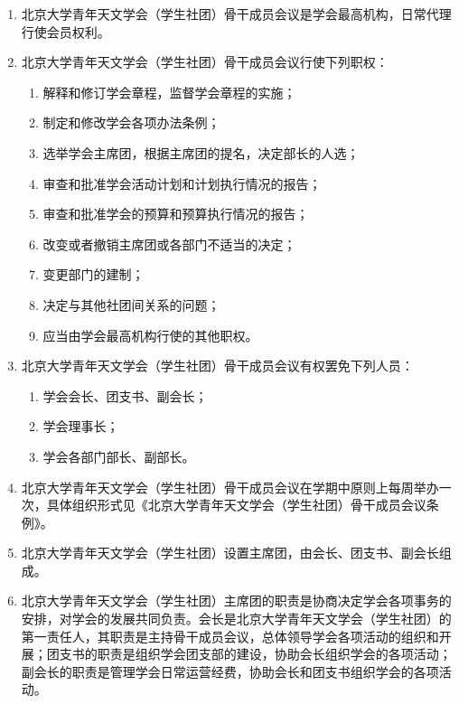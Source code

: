 \begin{enumerate}[resume]
    \item 北京大学青年天文学会（学生社团）骨干成员会议是学会最高机构，日常代理行使会员权利。
    
    \item 北京大学青年天文学会（学生社团）骨干成员会议行使下列职权：
    
    \begin{enumerate}
        \item 解释和修订学会章程，监督学会章程的实施；
        \item 制定和修改学会各项办法条例；
        \item 选举学会主席团，根据主席团的提名，决定部长的人选；
        \item 审查和批准学会活动计划和计划执行情况的报告；
        \item 审查和批准学会的预算和预算执行情况的报告；
        \item 改变或者撤销主席团或各部门不适当的决定；
        \item 变更部门的建制；
        \item 决定与其他社团间关系的问题；
        \item 应当由学会最高机构行使的其他职权。
    \end{enumerate}
    
    \item 北京大学青年天文学会（学生社团）骨干成员会议有权罢免下列人员：
    
    \begin{enumerate}
        \item 学会会长、团支书、副会长；
        \item 学会理事长；
        \item 学会各部门部长、副部长。
    \end{enumerate}
    
    \item 北京大学青年天文学会（学生社团）骨干成员会议在学期中原则上每周举办一次，具体组织形式见《北京大学青年天文学会（学生社团）骨干成员会议条例》。
    
    \item 北京大学青年天文学会（学生社团）设置主席团，由会长、团支书、副会长组成。
    
    \item 北京大学青年天文学会（学生社团）主席团的职责是协商决定学会各项事务的安排，对学会的发展共同负责。会长是北京大学青年天文学会（学生社团）的第一责任人，其职责是主持骨干成员会议，总体领导学会各项活动的组织和开展；团支书的职责是组织学会团支部的建设，协助会长组织学会的各项活动；副会长的职责是管理学会日常运营经费，协助会长和团支书组织学会的各项活动。
    

\end{enumerate}
